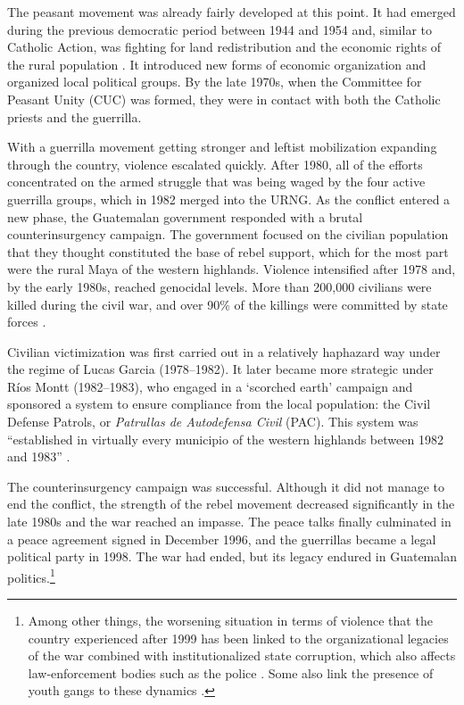\documentclass[12pt, notitlepage]{article}
\begin{document}
The peasant movement was already fairly developed at this point.
It had emerged during the previous democratic period between 1944 and 1954 and, similar to Catholic Action, was fighting for land redistribution and the economic rights of the rural population \citep{Handy:1994aa, Forster:2001aa}.
It introduced new forms of economic organization and organized local political groups.
By the late 1970s, when the Committee for Peasant Unity (CUC) was formed, they were in contact with both the Catholic priests and the guerrilla.

With a guerrilla movement getting stronger and leftist mobilization expanding through the country, violence escalated quickly.
After 1980, all of the efforts concentrated on the armed struggle that was being waged by the four active guerrilla groups, which in 1982 merged into the URNG.
As the conflict entered a new phase, the Guatemalan government responded with a brutal counterinsurgency campaign.
The government focused on the civilian population that they thought constituted the base of rebel support, which for the most part were the rural Maya of the western highlands.
Violence intensified after 1978 and, by the early 1980s, reached genocidal levels.
More than 200,000 civilians were killed during the civil war, and over 90\% of the killings were committed by state forces \citep{Ball:1999aa, CEH:1999aa}.

Civilian victimization was first carried out in a relatively haphazard way under the regime of Lucas Garcia (1978--1982).
It later became more strategic under Ríos Montt (1982--1983), who engaged in a `scorched earth' campaign and sponsored a system to ensure compliance from the local population: the Civil Defense Patrols, or \textit{Patrullas de Autodefensa Civil} (PAC).
This system was ``established in virtually every municipio of the western highlands between 1982 and 1983'' \citep[272]{Smith:1990ab}.

The counterinsurgency campaign was successful.
Although it did not manage to end the conflict, the strength of the rebel movement decreased significantly in the late 1980s and the war reached an impasse.
The peace talks finally culminated in a peace agreement signed in December 1996, and the guerrillas became a legal political party in 1998.
The war had ended, but its legacy endured in Guatemalan politics.\footnote{Among other things, the worsening situation in terms of violence that the country experienced after 1999 has been linked to the organizational legacies of the war combined with institutionalized state corruption, which also affects law-enforcement bodies such as the police \citep{Peacock:2003tt, Beltran:2016td, Booth:2010wd}. Some also link the presence of youth gangs to these dynamics \citep{Levenson:2013tm}.}
\end{document}
